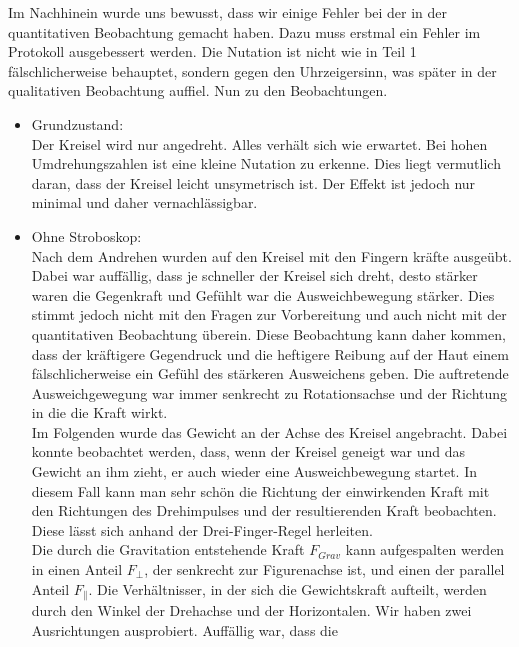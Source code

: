 Im Nachhinein wurde uns bewusst, dass wir einige Fehler bei der in der quantitativen Beobachtung gemacht haben. 
Dazu muss erstmal ein Fehler im Protokoll ausgebessert werden. Die Nutation ist nicht wie in Teil 1 fälschlicherweise 
behauptet, sondern gegen den Uhrzeigersinn, was später in der qualitativen Beobachtung auffiel. Nun zu den Beobachtungen.
\begin{itemize}
    \item Grundzustand:\\
        Der Kreisel wird nur angedreht. Alles verhält sich wie erwartet. Bei hohen Umdrehungszahlen ist eine kleine Nutation zu erkenne. Dies liegt vermutlich daran, dass der Kreisel
        leicht unsymetrisch ist. Der Effekt ist jedoch nur minimal und daher vernachlässigbar.
    \item Ohne Stroboskop:\\
        Nach dem Andrehen wurden auf den Kreisel mit den Fingern kräfte ausgeübt. Dabei war auffällig, dass je schneller der Kreisel sich dreht, desto stärker waren die Gegenkraft und Gefühlt war die Ausweichbewegung 
        stärker. Dies stimmt jedoch nicht mit den Fragen zur Vorbereitung und auch nicht mit der quantitativen Beobachtung überein. Diese Beobachtung kann daher kommen, 
        dass der kräftigere Gegendruck und die heftigere Reibung auf der Haut einem fälschlicherweise ein Gefühl des stärkeren Ausweichens geben.
        Die auftretende Ausweichgewegung war immer 
        senkrecht zu Rotationsachse und der Richtung in die die Kraft wirkt. \\
        Im Folgenden wurde das Gewicht an der Achse des Kreisel angebracht. Dabei konnte beobachtet werden, dass, wenn der Kreisel geneigt war und das Gewicht an ihm zieht, er auch wieder 
        eine Ausweichbewegung startet. In diesem Fall kann man sehr schön die Richtung der einwirkenden Kraft mit den Richtungen des Drehimpulses und der resultierenden Kraft beobachten.
        Diese lässt sich anhand der Drei-Finger-Regel herleiten.\\
        Die durch die Gravitation entstehende Kraft $F_{Grav}$ kann aufgespalten werden in einen Anteil $F_{\bot}$, der senkrecht zur Figurenachse ist, und einen der parallel Anteil $F_{\| }$. 
        Die Verhältnisser, in der sich die Gewichtskraft aufteilt, werden durch den Winkel der Drehachse und der Horizontalen. Wir haben zwei Ausrichtungen ausprobiert. Auffällig war, dass die 

\end{itemize}
